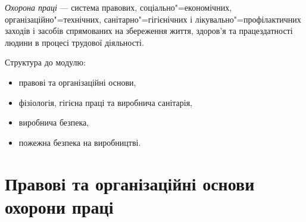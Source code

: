 \documentclass[a4paper,10pt,notitlepage,pdftex,headsepline]{scrartcl}
\begin{document}
  \emph{Охорона праці} --- система правових, соціально"=економічних,
  організаційно"=технічних, санітарно"=гігієнічних і лікувально"=профілактичних
  заходів і засобів спрямованих на збереження життя, здоров’я та
  працездатності людини в процесі трудової діяльності.

  Структура до модулю:
  \begin{itemize}
    \item правові та організаційні основи,
    \item фізіологія, гігієна праці та виробнича санітарія,
    \item виробнича безпека,
    \item пожежна безпека на виробництві.
  \end{itemize}
\section{Правові та організаційні основи охорони праці}
\end{document}
